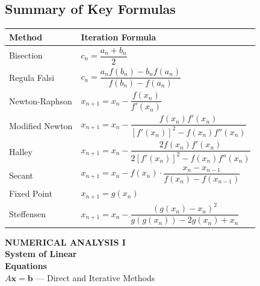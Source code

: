 \documentclass[12pt]{article}
\newcommand{\hcell}[1]{\textbf{\color{white}#1}}
\begin{document}
\bigskip

\subsection*{Summary of Key Formulas}

\begin{center}{\small
\begin{tabular}{p{3.2cm} p{10cm}}
\toprule
\rowcolor{primary}
\hcell{Method} & \hcell{Iteration Formula} \\
\midrule
\rowcolor{amberbg}
Bisection & $c_n = \dfrac{a_n+b_n}{2}$ \\[6pt]
Regula Falsi & $c_n = \dfrac{a_n f(b_n)-b_n f(a_n)}{f(b_n)-f(a_n)}$ \\[6pt]
\rowcolor{amberbg}
Newton-Raphson & $x_{n+1} = x_n - \dfrac{f(x_n)}{f'(x_n)}$ \\[6pt]
Modified Newton & $x_{n+1} = x_n - \dfrac{f(x_n)f'(x_n)}{[f'(x_n)]^2 - f(x_n)f''(x_n)}$ \\[6pt]
\rowcolor{amberbg}
Halley & $x_{n+1} = x_n - \dfrac{2f(x_n)f'(x_n)}{2[f'(x_n)]^2 - f(x_n)f''(x_n)}$ \\[6pt]
Secant & $x_{n+1} = x_n - f(x_n)\cdot\dfrac{x_n-x_{n-1}}{f(x_n)-f(x_{n-1})}$ \\[6pt]
\rowcolor{amberbg}
Fixed Point & $x_{n+1} = g(x_n)$ \\[6pt]
Steffensen & $x_{n+1} = x_n - \dfrac{(g(x_n)-x_n)^2}{g(g(x_n))-2g(x_n)+x_n}$ \\
\bottomrule
\end{tabular}
}\end{center}


\newpage



\begin{tcolorbox}[
  enhanced, arc=0pt, boxrule=0pt,
  colback=primary, colframe=primary,
  left=20pt, right=20pt, top=28pt, bottom=20pt,
  borderline south={5pt}{0pt}{accent},
]
  \centering
  {\fontsize{11}{14}\bfseries\color{accent}\MakeUppercase{Numerical Analysis I}}\\[10pt]
  {\fontsize{26}{32}\bfseries\color{white}
    System of Linear\\[6pt]Equations
  }\\[12pt]
  {\large\color{lightbg} $A\mathbf{x} = \mathbf{b}$ — Direct and Iterative Methods}
\end{tcolorbox}
\end{document}
